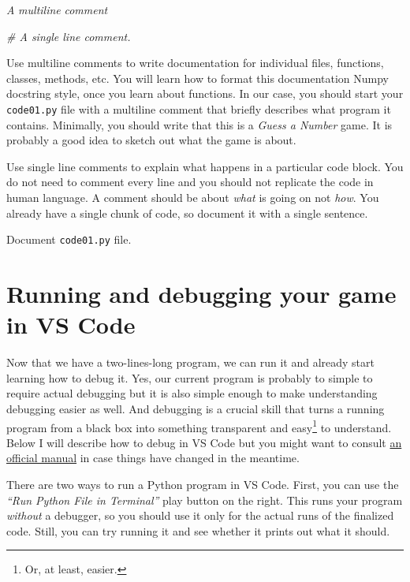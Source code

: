 \documentclass[
]{book}
\newenvironment{Shaded}{\begin{snugshade}}{\end{snugshade}}
\newcommand{\CommentTok}[1]{\textcolor[rgb]{0.56,0.35,0.01}{\textit{#1}}}
\begin{document}
\begin{Shaded}
\begin{Highlighting}[]
\CommentTok{\textquotesingle{}\textquotesingle{}\textquotesingle{}A }
\CommentTok{multiline }
\CommentTok{comment}
\CommentTok{\textquotesingle{}\textquotesingle{}\textquotesingle{}}

\CommentTok{\#  A single line comment.}
\end{Highlighting}
\end{Shaded}

Use multiline comments to write documentation for individual files, functions, classes, methods, etc. You will learn how to format this documentation Numpy docstring style, once you learn about functions. In our case, you should start your \texttt{code01.py} file with a multiline comment that briefly describes what program it contains. Minimally, you should write that this is a \emph{Guess a Number} game. It is probably a good idea to sketch out what the game is about.

Use single line comments to explain what happens in a particular code block. You do not need to comment every line and you should not replicate the code in human language. A comment should be about \emph{what} is going on not \emph{how}. You already have a single chunk of code, so document it with a single sentence.

Document \texttt{code01.py} file.

\hypertarget{debugging}{%
\section{Running and debugging your game in VS Code}\label{debugging}}

Now that we have a two-lines-long program, we can run it and already start learning how to debug it. Yes, our current program is probably to simple to require actual debugging but it is also simple enough to make understanding debugging easier as well. And debugging is a crucial skill that turns a running program from a black box into something transparent and easy\footnote{Or, at least, easier.} to understand. Below I will describe how to debug in VS Code but you might want to consult \href{https://code.visualstudio.com/docs/python/debugging}{an official manual} in case things have changed in the meantime.

There are two ways to run a Python program in VS Code. First, you can use the \emph{``Run Python File in Terminal''} play button on the right. This runs your program \emph{without} a debugger, so you should use it only for the actual runs of the finalized code. Still, you can try running it and see whether it prints out what it should.
\end{document}
